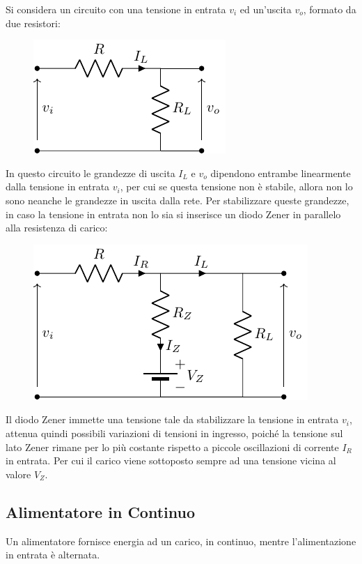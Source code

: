 \documentclass{article}
\numberwithin{equation}{subsection}
\begin{document}
Si considera un circuito con una tensione in entrata $v_i$ ed un'uscita $v_o$, formato da due resistori:
\begin{figure}[H]%
    \centering
    \includegraphics{circuito-zener.pdf}%
    \label{fig:circuito-zener}
\end{figure}
In questo circuito le grandezze di uscita $I_L$ e $v_o$ dipendono entrambe linearmente dalla tensione in entrata $v_i$, per cui se questa tensione 
non è stabile, allora non lo sono neanche le grandezze in uscita dalla rete. Per stabilizzare queste grandezze, in caso la tensione in entrata non lo 
sia si inserisce un diodo Zener in parallelo alla resistenza di carico:
\begin{figure}[H]%
    \centering
    \includegraphics{circuito-diodo-zener.pdf}%
    \label{fig:circuito-diodo-zener}
\end{figure}

Il diodo Zener immette una tensione tale da stabilizzare la tensione in entrata $v_i$, attenua quindi possibili variazioni di tensioni in ingresso, poiché la tensione 
sul lato Zener rimane per lo più costante rispetto a piccole oscillazioni di corrente $I_R$ in entrata. Per cui il carico viene sottoposto sempre ad una tensione vicina 
al valore $V_Z$. 

\subsection{Alimentatore in Continuo}

Un alimentatore fornisce energia ad un carico, in continuo, mentre l'alimentazione in entrata è alternata. 
\end{document}
